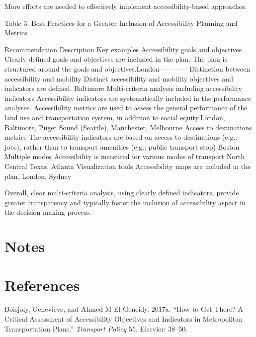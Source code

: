 \documentclass[12pt,]{article}
\begin{document}
More efforts are needed to effectively implement accessibility-based
approaches.

Table 3. Best Practices for a Greater Inclusion of Accessibility
Planning and Metrics.

\textbar{}Recommendation \textbar{}Description\textbar{} Key examples
Accessibility goals and objectives \textbar{}Clearly defined goals and
objectives are included in the plan. The plan is structured around the
goals and objectives.\textbar{}London \textbar{} --- \textbar{} ---
\textbar{} --- \textbar{} Distinction between accessibility and mobility
\textbar{}Distinct accessibility and mobility objectives and indicators
are defined. \textbar{}Baltimore \textbar{}Multi-criteria analysis
including accessibility indicators \textbar{}Accessibility indicators
are systematically included in the performance analyses. Accessibility
metrics are used to assess the general performance of the land use and
transportation system, in addition to social equity.\textbar{}London,
Baltimore, Puget Sound (Seattle), Manchester, Melbourne \textbar{}Access
to destinations metrics \textbar{}The accessibility indicators are based
on access to destinations (e.g.: jobs), rather than to transport
amenities (e.g.: public transport stop) \textbar{}Boston
\textbar{}Multiple modes \textbar{}Accessibility is measured for various
modes of transport \textbar{}North Central Texas, Atlanta
\textbar{}Visualization tools \textbar{}Accessibility maps are included
in the plan. \textbar{}London, Sydney

Overall, clear multi-criteria analysis, using clearly defined
indicators, provide greater transparency and typically foster the
inclusion of accessibility aspect in the decision-making process.

\hypertarget{notes}{%
\section{Notes}\label{notes}}

\hypertarget{references}{%
\section*{References}\label{references}}

\hypertarget{refs}{}
\leavevmode\hypertarget{ref-boisjoly2017get}{}%
Boisjoly, Geneviève, and Ahmed M El-Geneidy. 2017a. ``How to Get There?
A Critical Assessment of Accessibility Objectives and Indicators in
Metropolitan Transportation Plans.'' \emph{Transport Policy} 55.
Elsevier: 38--50.
\end{document}
